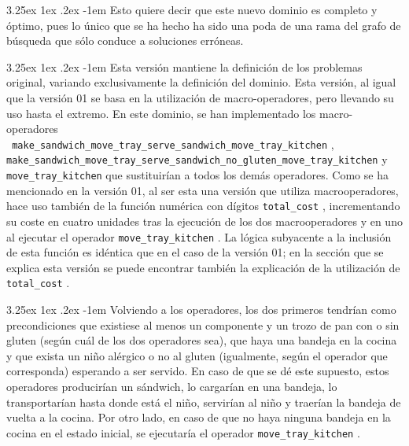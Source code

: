 \documentclass{article}
\makeatletter
\newcommand{\cool}[1] {
        {\texttt{#1}}
    }
\newcounter{subsubsubsection}
\renewcommand\paragraph{\@startsection{paragraph}{5}{\z@}%
      {3.25ex \@plus1ex \@minus.2ex}%
      {-1em}%
      {\normalfont\normalsize\bfseries}}
\makeatother
\begin{document}
    \paragraph{}
    Esto quiere decir que este nuevo dominio es completo y óptimo, pues lo único que se ha hecho ha sido una poda de una rama del grafo de búsqueda que sólo conduce a soluciones erróneas.
    
    
    \paragraph{}
    Esta versión mantiene la definición de los problemas original, variando exclusivamente la definición del dominio. Esta versión, al igual que la versión 01 se basa en la utilización de macro-operadores, pero llevando su uso hasta el extremo. En este dominio, se han implementado los macro-operadores \\ \cool{ make\_sandwich\_move\_tray\_serve\_sandwich\_move\_tray\_kitchen}, \\ \cool{make\_sandwich\_move\_tray\_serve\_sandwich\_no\_gluten\_move\_tray\_kitchen} y \\ \cool{move\_tray\_kitchen} que sustituirían a todos los demás operadores. Como se ha mencionado en la versión 01, al ser esta una versión que utiliza macrooperadores, hace uso también de la función numérica con dígitos \cool{total\_cost}, incrementando su coste en cuatro unidades tras la ejecución de los dos macrooperadores y en uno al ejecutar el operador \cool{move\_tray\_kitchen}. La lógica subyacente a la inclusión de esta función es idéntica que en el caso de la versión 01; en la sección que se explica esta versión se puede encontrar también la explicación de la utilización de \cool{total\_cost}.
    
    \paragraph{}
    Volviendo a los operadores, los dos primeros tendrían como precondiciones que existiese al menos un componente y un trozo de pan con o sin gluten (según cuál de los dos operadores sea), que haya una bandeja en la cocina y que exista un niño alérgico o no al gluten (igualmente, según el operador que corresponda) esperando a ser servido. En caso de que se dé este supuesto, estos operadores producirían un sándwich, lo cargarían en una bandeja, lo transportarían hasta donde está el niño, servirían al niño y traerían la bandeja de vuelta a la cocina. Por otro lado, en caso de que no haya ninguna bandeja en la cocina en el estado inicial, se ejecutaría el operador \cool{move\_tray\_kitchen}.
    
\end{document}
